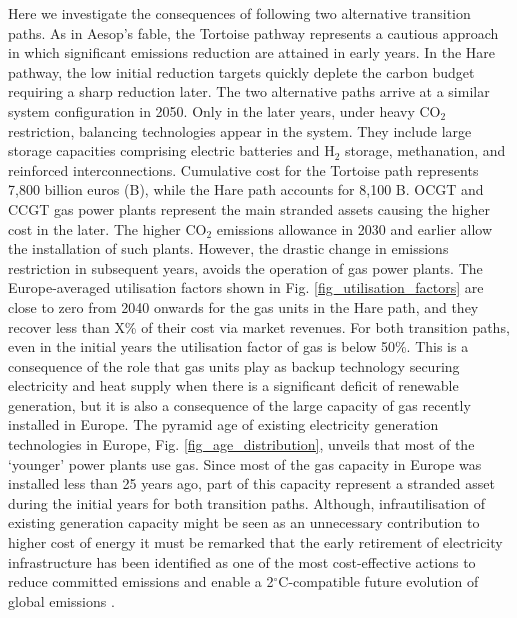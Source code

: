 \documentclass[5p]{elsarticle} %
\begin{document}
Here we investigate the consequences of following two alternative transition paths. As in Aesop's fable, the Tortoise pathway represents a cautious approach in which significant emissions reduction are attained in early years. In the Hare pathway, the low initial reduction targets quickly deplete the carbon budget requiring a sharp reduction later. The two alternative paths arrive at a similar system configuration in 2050. Only in the later years, under heavy CO$_2$ restriction, balancing technologies appear in the system. They include large storage capacities comprising electric batteries and H$_2$ storage, methanation, and reinforced interconnections.  Cumulative cost for the Tortoise path represents 7,800 billion euros (B\EUR), while the Hare path accounts for 8,100 B\EUR. OCGT and CCGT gas power plants represent the main stranded assets causing the higher cost in the later. The higher CO$_2$ emissions allowance in 2030 and earlier allow the installation of such plants. However, the drastic change in emissions restriction in subsequent years, avoids the operation of gas power plants. The Europe-averaged utilisation factors shown in Fig. \ref{fig_utilisation_factors} are close to zero from 2040 onwards for the gas units in the Hare path, and they recover less than \textcolor[rgb]{1,0,0}{X\%} of their cost via market revenues. For both transition paths, even in the initial years the utilisation factor of gas is below 50\%. This is a consequence of the role that gas units play as backup technology securing electricity and heat supply when there is a significant deficit of renewable generation, but it is also a consequence of the large capacity of gas recently installed in Europe. The pyramid age of existing electricity generation technologies in Europe, Fig. \ref{fig_age_distribution}, unveils that most of the `younger' power plants use gas. Since most of the gas capacity in Europe was installed less than 25 years ago, part of this capacity represent a stranded asset during the initial years for both transition paths. Although, infrautilisation of existing generation capacity might be seen as an unnecessary contribution to higher cost of energy it must be remarked that the early retirement of electricity infrastructure has been identified as one of the most cost-effective actions to reduce committed emissions and enable a 2$^{\circ}$C-compatible future evolution of global emissions \cite{Tong_2019}.
\end{document}
